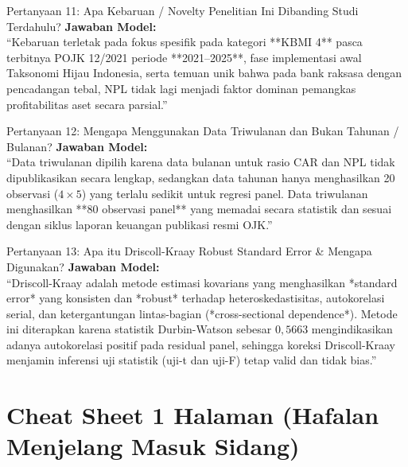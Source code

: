 \documentclass[11pt,a4paper]{article}
\begin{document}
\begin{qnabox}{Pertanyaan 11: Apa Kebaruan / Novelty Penelitian Ini Dibanding Studi Terdahulu?}
\textbf{Jawaban Model:}\\
``Kebaruan terletak pada fokus spesifik pada kategori **KBMI 4** pasca terbitnya POJK 12/2021 periode **2021--2025**, fase implementasi awal Taksonomi Hijau Indonesia, serta temuan unik bahwa pada bank raksasa dengan pencadangan tebal, NPL tidak lagi menjadi faktor dominan pemangkas profitabilitas aset secara parsial.''
\end{qnabox}

\begin{qnabox}{Pertanyaan 12: Mengapa Menggunakan Data Triwulanan dan Bukan Tahunan / Bulanan?}
\textbf{Jawaban Model:}\\
``Data triwulanan dipilih karena data bulanan untuk rasio CAR dan NPL tidak dipublikasikan secara lengkap, sedangkan data tahunan hanya menghasilkan 20 observasi ($4 \times 5$) yang terlalu sedikit untuk regresi panel. Data triwulanan menghasilkan **80 observasi panel** yang memadai secara statistik dan sesuai dengan siklus laporan keuangan publikasi resmi OJK.''
\end{qnabox}

\begin{qnabox}{Pertanyaan 13: Apa itu Driscoll-Kraay Robust Standard Error \& Mengapa Digunakan?}
\textbf{Jawaban Model:}\\
``Driscoll-Kraay adalah metode estimasi kovarians yang menghasilkan *standard error* yang konsisten dan *robust* terhadap heteroskedastisitas, autokorelasi serial, dan ketergantungan lintas-bagian (*cross-sectional dependence*). Metode ini diterapkan karena statistik Durbin-Watson sebesar $0{,}5663$ mengindikasikan adanya autokorelasi positif pada residual panel, sehingga koreksi Driscoll-Kraay menjamin inferensi uji statistik (uji-t dan uji-F) tetap valid dan tidak bias.''
\end{qnabox}

\newpage
\section{Cheat Sheet 1 Halaman (Hafalan Menjelang Masuk Sidang)}
\end{document}
